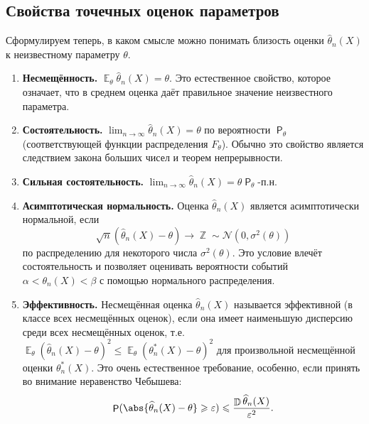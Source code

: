 \documentclass[12pt]{article}
\DeclareMathOperator{\mexp}{\mathbb{E}}
\DeclareMathOperator{\var}{\mathbb{D}}
\DeclareMathOperator{\prob}{\mathsf{P}}
\renewcommand{\geq}{\geqslant}
\renewcommand{\leq}{\leqslant}
\DeclareMathOperator{\ZZ}{\mathbb{Z}}
\begin{document}
    \subsection{Свойства точечных оценок параметров}
    Сформулируем теперь, в каком смысле можно понимать близость оценки $\widehat{\theta}_n(X)$ к неизвестному параметру $\theta$.
    \begin{enumerate}[label=\Roman*.]
        \item \textbf{Несмещённость.} $\mexp_\theta \widehat{\theta}_n(X) = \theta$. Это естественное свойство, которое означает, что в среднем оценка даёт правильное значение неизвестного параметра.
        \item \textbf{Состоятельность.} $\lim_{n \to \infty} \widehat{\theta}_n(X) = \theta$ по вероятности $\prob_\theta$ (соответствующей функции распределения $F_\theta$). Обычно это свойство является следствием закона больших чисел и теорем непрерывности.
        \item \textbf{Сильная состоятельность.} $\lim_{n \to \infty} \widehat{\theta}_n(X) = \theta \prob_\theta$-п.н.
        \item \textbf{Асимптотическая нормальность.} Оценка $\widehat{\theta}_n(X)$ является асимптотически нормальной, если
        \begin{equation*}
            \sqrt{n}\left(\widehat{\theta}_n(X) - \theta\right) \to \ZZ \sim \mathcal{N\left(0, \sigma^2(\theta)\right)}
        \end{equation*}
        по распределению для некоторого числа $\sigma^2(\theta)$. Это условие влечёт состоятельность и позволяет оценивать вероятности событий $\alpha < \theta_n(X) < \beta$ с помощью нормального распределения.
        \item \textbf{Эффективность.} Несмещённая оценка $\widehat{\theta}_n(X)$ называется эффективной (в классе всех несмещённых оценок), если она имеет наименьшую дисперсию среди всех несмещённых оценок, т.е. $\mexp_\theta\left(\widehat{\theta}_n(X) - \theta\right)^2 \leq \mexp_\theta(\theta_n^*(X) - \theta)^2$ для произвольной несмещённой оценки $\theta_n^*(X)$. Это очень естественное требование, особенно, если принять во внимание неравенство Чебышева:
        \begin{equation*}
            \prob(\abs{\widehat{\theta}_n(X) - \theta} \geq \varepsilon) \leq \frac{\var\widehat{\theta}_n(X)}{\varepsilon^2}. 
        \end{equation*}
    \end{enumerate}
    
\end{document}
